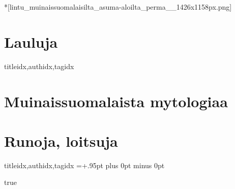   *[lintu_muinaissuomalaisilta_asuma-aloilta_perma__1426x1158px.png]
    \begin{finnish} %
      \section{Lauluja}
        \begin{songs}{titleidx,authidx,tagidx}
          
          
        \end{songs}
      \clearpage\scleardpage
      \section{Muinaissuomalaista mytologiaa}
        
      \clearpage\scleardpage
      \section{Runoja, loitsuja}
        \begin{songs}{titleidx,authidx,tagidx}
          \ifchorded\newcommand{\waschorded}{true}\fi
          \chordsoff %
          \baselineadj=+.95pt plus 0pt minus 0pt %
          \renewcommand{\lyricfont}{\small} %
          
          \renewcommand{\lyricfont}{\defaultlyricfont} %
          \baselineadj=0pt %
          \ifdefined\waschorded\chordson\fi %
        \end{songs}
    \end{finnish}

